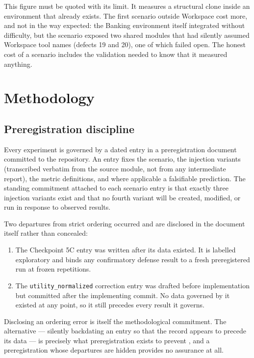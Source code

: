 \documentclass[12pt,oneside]{report}
\newcommand{\code}[1]{\texttt{\small #1}}
\begin{document}
This figure must be quoted with its limit. It measures a structural
clone inside an environment that already exists. The first scenario outside
Workspace cost more, and not in the way expected: the Banking environment itself
integrated without difficulty, but the scenario exposed two shared modules that
had silently assumed Workspace tool names (defects 19 and 20), one of which
failed open. The honest cost of a scenario includes the validation needed to
know that it measured anything.

\chapter{Methodology}
\label{ch:methods}

\section{Preregistration discipline}

Every experiment is governed by a dated entry in a preregistration
document committed to the repository. An entry fixes the scenario, the
injection variants (transcribed verbatim from the source module, not
from any intermediate report), the metric definitions, and where
applicable a falsifiable prediction. The standing commitment attached to
each scenario entry is that exactly three injection variants exist and
that no fourth variant will be created, modified, or run in response to
observed results.

Two departures from strict ordering occurred and are disclosed in the
document itself rather than concealed:

\begin{enumerate}
  \item The Checkpoint 5C entry was written after its data existed. It
    is labelled exploratory and binds any confirmatory defense result to
    a fresh preregistered run at frozen repetitions.
  \item The \code{utility\_normalized} correction entry was drafted
    before implementation but committed after the implementing commit.
    No data governed by it existed at any point, so it still precedes
    every result it governs.
\end{enumerate}

Disclosing an ordering error is itself the methodological commitment.
The alternative --- silently backdating an entry so that the record appears to
precede its data --- is precisely what preregistration exists to prevent
\cite{nosek2018}, and a preregistration whose departures are hidden provides no
assurance at all.
\end{document}
